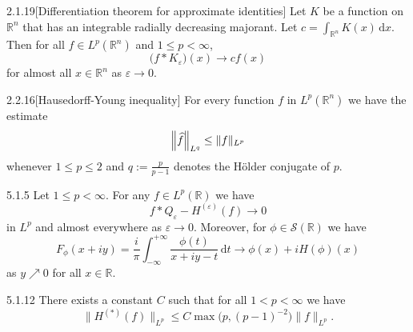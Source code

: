 \documentclass[../dissertation.tex]{subfiles}
\begin{document}
\begin{mcor}{2.1.19}[Dif{}ferentiation theorem for approximate identities]
	Let $K$ be a function on $\mathbb R^n$ that has an integrable radially 
	decreasing majorant. Let $c = \int_{\mathbb R^n} K(x) \, \mathrm{d}x$. Then for all 
	$f \in L^p(\mathbb R^n)$ and $1 \leq p < \infty$, 
	\[
		\big( f * K_\varepsilon \big)(x) \to c f(x)
	\]
	for almost all $x \in \mathbb R^n$ as $\varepsilon \to 0$.
\end{mcor}


\begin{mprop}{2.2.16}[Hausedorf{}f-Young inequality]
	For every function $f$ in $L^p(\mathbb R^n)$ we have the estimate
	\[
		\left\|\widehat{f} \right\|_{L^{q}} \leq \|f\|_{L^p}
	\]
	whenever $1\leq p\leq 2$ and $q:= \frac{p}{p-1}$ denotes the 
	H\"older conjugate of $p$.
\end{mprop}


\begin{mthm}{5.1.5}
	Let $1\leq p < \infty$. For any $f \in L^p(\mathbb R)$ we have
	\[
		f*Q_\varepsilon - H^{(\varepsilon)}(f) \to 0
	\]
	in $L^p$ and almost everywhere as $\varepsilon \to 0$. Moreover, for 
	$\phi \in \mathscr S(\mathbb R)$ we have
	\[
		F_\phi(x + iy)
			= \frac{i}{\pi} \int_{-\infty}^{+\infty} 
					\frac{\phi(t)}{x+iy - t}
				\, \mathrm{d}t
			\to \phi(x) + i H(\phi)(x)
	\]
	as $y\nearrow0$ for all $x \in \mathbb R$.
\end{mthm}


\begin{mthm}{5.1.12}
	There exists a constant $C$ such that for all $1< p< \infty$ we have 
	\[
		\|H^{(*)}(f)\|_{L^p} 
			\leq C \max \big(p, (p-1)^{-2}\big) \|f\|_{L^p}.
	\]
\end{mthm}
\end{document}
